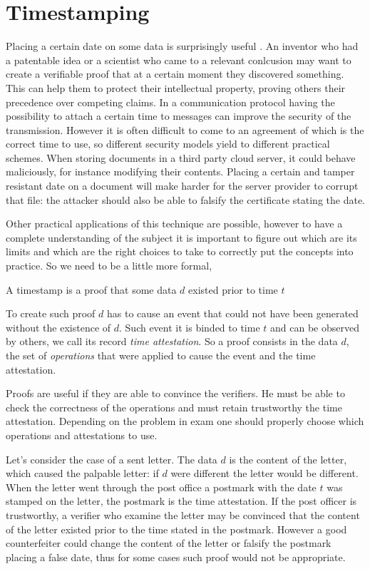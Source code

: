 \chapter{Timestamping}
\label{chpr:timestamping}
Placing a certain date on some data is surprisingly useful \cite{Haber91howto} \cite{Bayer93improvingthe} \cite{Massias99designof} \cite{OTSannouncment}.
An inventor who had a patentable idea or a scientist who came to a relevant conlcusion may want to create a verifiable proof that at a certain moment they discovered something. This can help them to protect their intellectual property, proving others their precedence over competing claims.
In a communication protocol having the possibility to attach a certain time to messages can improve the security of the transmission. However it is often difficult to come to an agreement of which is the correct time to use, so different security models yield to different practical schemes.
When storing documents in a third party cloud server, it could behave maliciously, for instance modifying their contents. Placing a certain and tamper resistant date on a document will make harder for the server provider to corrupt that file: the attacker should also be able to falsify the certificate stating the date. 

Other practical applications of this technique are possible, however to have a complete understanding of the subject it is important to figure out which are its limits and which are the right choices to take to correctly put the concepts into practice. So we need to be a little more formal,
\begin{mydef}
	A timestamp is a proof that some data $d$ existed prior to time $t$
\end{mydef}
To create such proof $d$ has to cause an event that could not have been generated without the existence of $d$. Such event it is binded to time $t$ and can be observed by others, we call its record \textit{time attestation}. So a proof consists in the data $d$, the set of \textit{operations} that were applied to cause the event and the time attestation.

Proofs are useful if they are able to convince the verifiers. He must be able to check the correctness of the operations and must retain trustworthy the time attestation. Depending on the problem in exam one should properly choose which operations and attestations to use. 

Let's consider the case of a sent letter. The data $d$ is the content of the letter, which caused the palpable letter: if $d$ were different the letter would be different. When the letter went through the post office a postmark with the date $t$ was stamped on the letter, the postmark is the time attestation. If the post officer is trustworthy, a verifier who examine the letter may be convinced that the content of the letter existed prior to the time stated in the postmark. However a good counterfeiter could change the content of the letter or falsify the postmark placing a false date, thus for some cases such proof would not be appropriate.

